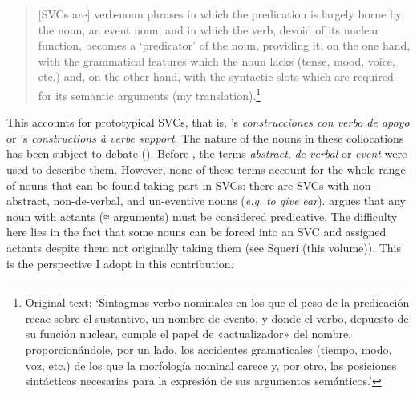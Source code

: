 \documentclass[output=paper,colorlinks,citecolor=brown]{langscibook}
\begin{document}
\begin{quote}

  {[}SVCs are{]} verb-noun phrases in which the predication is largely borne
  by the noun, an event noun, and in which the verb, devoid of its nuclear function,
  becomes a `predicator' of the noun, providing it, on the one hand, with the grammatical
  features which the noun lacks (tense, mood, voice, etc.) and, on the other hand, with the
  syntactic slots which are required for its semantic arguments (my
  translation).\footnote{Original text: `Sintagmas verbo-nominales en los que el peso de
    la predicación recae sobre el sustantivo, un nombre de evento, y donde el verbo,
    depuesto de su función nuclear, cumple el papel de «actualizador» del nombre,
    proporcionándole, por un lado, los accidentes gramaticales (tiempo, modo, voz, etc.)
    de los que la morfología nominal carece y, por otro, las posiciones sintácticas
    necesarias para la expresión de sus argumentos semánticos.'}

\end{quote}

This accounts for prototypical SVCs, that is, \citet{alonso_ramos_construcciones_2004}'s
\emph{construcciones con verbo de apoyo} or \citet{vives_aspect_1984}'s \emph{constructions
  à verbe support}. The nature of the nouns in these collocations has  been subject to
debate (\cite[115-129]{alonso_ramos_construcciones_2004}). Before
\citet{alonso_ramos_construcciones_2004}, the terms \emph{abstract},
\emph{de-verbal} or \emph{event} were used to describe them. However, none of these terms
account for the whole range of nouns that can be found taking part in SVCs: there are SVCs
with non-abstract, non-de-verbal, and un-eventive nouns (\emph{e.g.} \emph{to give
  ear}). \citet[115]{alonso_ramos_construcciones_2004} argues that any noun with actants
(≈ arguments) must be considered predicative. The difficulty here lies in the fact that
some nouns can be forced into an SVC and assigned actants despite them not originally
taking them (see Squeri (this volume)). This is the perspective I adopt
in this contribution.
\end{document}
